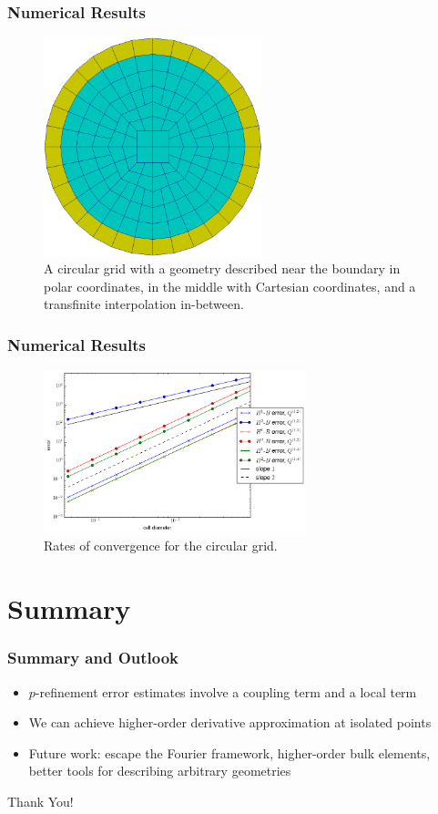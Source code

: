 \documentclass[8pt]{beamer}
\begin{document}
\begin{frame}
    \frametitle{Numerical Results}
    \begin{figure}
        \centering

        \includegraphics[width=2.5in]{Pictures/circular-grid.png}
        \caption{A circular grid with a geometry described near the boundary in
        polar coordinates, in the middle with Cartesian coordinates, and a
        transfinite interpolation in-between.}
    \end{figure}
\end{frame}

\begin{frame}
    \frametitle{Numerical Results}
    \begin{figure}
        \centering

        \includegraphics[width=3in]{Pictures/circle-nonnormal-convergence.png}
        \caption{Rates of convergence for the circular grid.}
    \end{figure}
\end{frame}

\section{Summary}
\begin{frame}
    \frametitle{Summary and Outlook}
    \begin{itemize}
        \item \(p\)-refinement error estimates involve a coupling term and a
              local term
        \item We can achieve higher-order derivative approximation at isolated
              points
        \item Future work: escape the Fourier framework, higher-order bulk
              elements, better tools for describing arbitrary geometries
    \end{itemize}
\end{frame}

\begin{frame}
    \begin{center}
    \textcolor{RPIred}{\Huge Thank You!}
    \end{center}
\end{frame}
\end{document}
